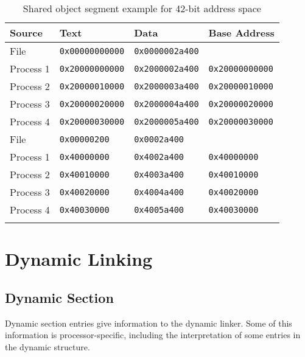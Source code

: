 \documentclass[english,11pt,twoside,toc=bib,toc=idx]{scrreprt}
\newenvironment{DIFnomarkup}{}{} %
\begin{document}
\begin{table}
  \centering
  \begin{DIFnomarkup}
  \begin{tabular}{llll}
    \toprule
    Source & Text & Data & Base Address \\
    \midrule
    \ifzseries
    File & \texttt{0x00000000000} & \texttt{0x0000002a400} & \\
    Process 1 & \texttt{0x20000000000} & \texttt{0x2000002a400} &
    \texttt{0x20000000000} \\
    Process 2 & \texttt{0x20000010000} & \texttt{0x2000003a400} &
    \texttt{0x20000010000} \\
    Process 3 & \texttt{0x20000020000} & \texttt{0x2000004a400} &
    \texttt{0x20000020000} \\
    Process 4 & \texttt{0x20000030000} & \texttt{0x2000005a400} &
    \texttt{0x20000030000} \\
    \else
    File & \texttt{0x00000200} & \texttt{0x0002a400} & \\
    Process 1 & \texttt{0x40000000} & \texttt{0x4002a400} &
    \texttt{0x40000000} \\
    Process 2 & \texttt{0x40010000} & \texttt{0x4003a400} &
    \texttt{0x40010000} \\
    Process 3 & \texttt{0x40020000} & \texttt{0x4004a400} &
    \texttt{0x40020000} \\
    Process 4 & \texttt{0x40030000} & \texttt{0x4005a400} &
    \texttt{0x40030000} \\
    \fi
    \bottomrule
  \end{tabular}
  \end{DIFnomarkup}
  \caption{Shared object segment example\ifzseries{} for 42-bit
    address space\fi}
  \label{tab:soseg}
\end{table}

\section{Dynamic Linking}
\label{dynamiclinking}
\subsection{Dynamic Section}
Dynamic section entries give information to the dynamic linker.  Some
of this information is processor-specific, including the
interpretation of some entries in the dynamic structure.
\end{document}
